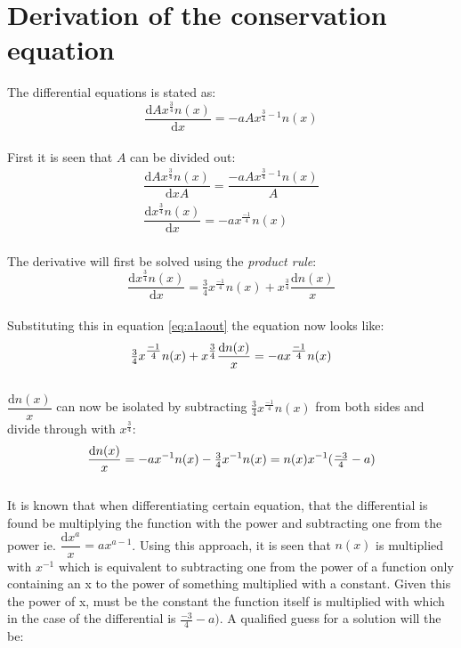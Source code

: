 \documentclass{article}
\numberwithin{equation}{section} %
\newcommand{\md}{\mathrm{d}}
\begin{document}
\section{Derivation of the conservation equation}\label{a:calcEx1a}
The differential equations is stated as:
\begin{equation}\label{eq:a1ori}
	\dfrac{\md Ax^{\tfrac{3}{4}}n(x)}{\md x} = -aAx^{\tfrac{3}{4}-1}n(x)
\end{equation}\\
First it is seen that $A$ can be divided out:
\begin{align}
	\dfrac{\md Ax^{\tfrac{3}{4}}n(x)}{\md xA} = \dfrac{-aAx^{\tfrac{3}{4}-1}n(x)}{A}\\
	\dfrac{\md x^{\tfrac{3}{4}}n(x)}{\md x} = -ax^{\tfrac{-1}{4}}n(x) \label{eq:a1aout}
\end{align}\\
The derivative will first be solved using the \textit{product rule}:
\begin{equation}
	\dfrac{\md x^{\tfrac{3}{4}}n(x)}{\md x} = \tfrac{3}{4}x^{\tfrac{-1}{4}}n(x)+x^{\tfrac{3}{4}}\dfrac{\md n(x)}{x}
\end{equation}\\
Substituting this in equation \ref{eq:a1aout} the equation now looks like:
\begin{equation}
\tfrac{3}{4}x^{\tfrac{-1}{4}}n(x)+x^{\tfrac{3}{4}}\dfrac{\md n(x)}{x} = -ax^{\tfrac{-1}{4}}n(x)\\
\end{equation}\\
$\dfrac{\md n(x)}{x}$ can now be isolated by subtracting $\tfrac{3}{4}x^{\tfrac{-1}{4}}n(x)$ from both sides and divide through with $x^{\tfrac{3}{4}}$:
\begin{equation}
\dfrac{\md n(x)}{x} = -ax^{-1}n(x)-\tfrac{3}{4}x^{-1}n(x)=n(x)x^{-1}(\tfrac{-3}{4}-a)\\
\end{equation}\\
It is known that when differentiating certain equation, that the differential is found be multiplying the
function with the power and subtracting one from the power ie. $\dfrac{\md x^{a}}{x}=ax^{a-1}$. Using
this approach, it is seen that $n(x)$ is multiplied with $x^{-1}$ which is equivalent to subtracting one
from the power of a function only containing an x to the power of something multiplied with a constant.
Given this the power of x, must be the constant the function itself is multiplied with which in the case
of the differential is $\tfrac{-3}{4}-a)$. A qualified guess for a solution will the be:
\end{document}
